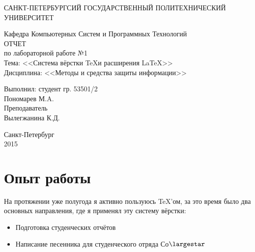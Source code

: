 \documentclass[utf8x, 12pt]{G7-32}
\begin{document}
\frontmatter 


\begin{center} 

\large САНКТ-ПЕТЕРБУРГСИЙ ГОСУДАРСТВЕННЫЙ ПОЛИТЕХНИЧЕСКИЙ УНИВЕРСИТЕТ

\large Кафедра Компьютерных Систем и Программных Технологий \\[5.5cm] 

\huge ОТЧЕТ \\[0.6cm] %
\large по лабораторной работе №1\\
\large Тема: <<Система вёрстки \TeX и расширения \LaTeX>>\\
\large Дисциплина: <<Методы и средства защиты информации>>\\[3.7cm]

\end{center} 

\begin{flushright}
Выполнил: студент гр. 53501/2 \\
Пономарев М.A. \\[1.2cm]


Преподаватель \\
Вылегжанина К.Д.
\end{flushright}


\vfill 

\begin{center} 
\large Санкт-Петербург \\
2015
\end{center} 

\thispagestyle{empty}



\thispagestyle{empty}
\setcounter{page}{0}
\tableofcontents
\clearpage
\mainmatter



\chapter{Опыт работы}

На протяжении уже полугода я активно пользуюсь \TeX 'ом, за это время было два основных направления, где я применял эту систему вёрстки:

\begin{itemize}
	\item Подготовка студенческих отчётов
	\item Написание песенника для студенческого отряда Со$\largestar$
\end{itemize}
\end{document}
